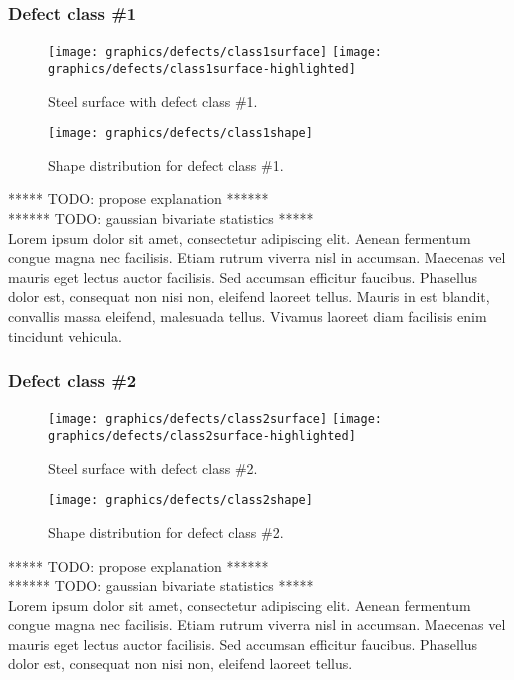         \subsubsection{Defect class \#1}
            \begin{figure}
                \texttt{[image: graphics/defects/class1surface]}
                \texttt{[image: graphics/defects/class1surface-highlighted]}
                \caption{Steel surface with defect class \#1.}\label{fig:defects:surface-1}
            \end{figure}
            \begin{figure}
                \texttt{[image: graphics/defects/class1shape]}
                \caption{Shape distribution for defect class \#1.}\label{fig:defects:shape-1}
            \end{figure}
            \par{
                ***** TODO: propose explanation ******\\
                ****** TODO: gaussian bivariate statistics *****\\
                Lorem ipsum dolor sit amet, consectetur adipiscing elit. Aenean fermentum congue magna nec facilisis. Etiam rutrum viverra nisl in accumsan. Maecenas vel mauris eget lectus auctor facilisis. Sed accumsan efficitur faucibus. Phasellus dolor est, consequat non nisi non, eleifend laoreet tellus. Mauris in est blandit, convallis massa eleifend, malesuada tellus. Vivamus laoreet diam facilisis enim tincidunt vehicula.
            }

        \subsubsection{Defect class \#2}
            \begin{figure}
                \texttt{[image: graphics/defects/class2surface]}
                \texttt{[image: graphics/defects/class2surface-highlighted]}
                \caption{Steel surface with defect class \#2.}\label{fig:defects:surface-2}
            \end{figure}
            \begin{figure}
                \texttt{[image: graphics/defects/class2shape]}
                \caption{Shape distribution for defect class \#2.}\label{fig:defects:shape-2}
            \end{figure}
            \par{
                ***** TODO: propose explanation ******\\
                ****** TODO: gaussian bivariate statistics *****\\
                Lorem ipsum dolor sit amet, consectetur adipiscing elit. Aenean fermentum congue magna nec facilisis. Etiam rutrum viverra nisl in accumsan. Maecenas vel mauris eget lectus auctor facilisis. Sed accumsan efficitur faucibus. Phasellus dolor est, consequat non nisi non, eleifend laoreet tellus.
            }
